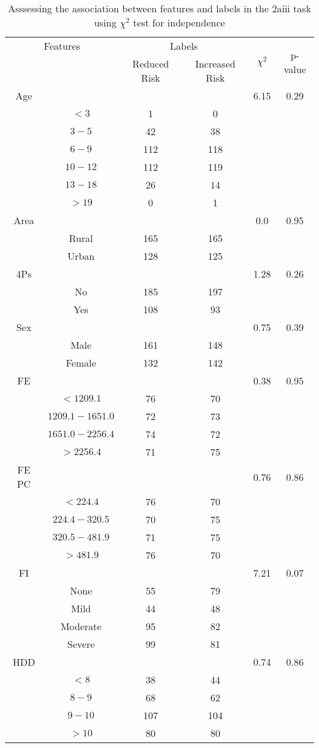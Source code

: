 \begin{table}[!htb]
\centering
\caption{Asssessing the association between features and labels in the 2aiii task using $\chi^2$ test for independence}
\label{tab:chitest_2aiii}
\begin{tabular}{c c | c c| c | c}
\hline
\multicolumn{2}{c|}{Features}& \multicolumn{2}{c|}{Labels}& \multirow{2}{*}{$\chi^2$} & \multirow{2}{*}{p-value}\\ 
& & Reduced Risk & Increased Risk & & \\ 
\hline
Age &  &  & & 6.15 & 0.29 \\ 
& $< 3$ & 1 & 0& & \\ 
& $3-5$ & 42 & 38& & \\ 
& $6-9$ & 112 & 118& & \\ 
& $10-12$ & 112 & 119& & \\ 
& $13-18$ & 26 & 14& & \\ 
& $> 19$ & 0 & 1& & \\ 
\hline 
Area &  &  & & 0.0 & 0.95 \\ 
& Rural & 165 & 165& & \\ 
& Urban & 128 & 125& & \\ 
\hline 
4Ps &  &  & & 1.28 & 0.26 \\ 
& No & 185 & 197& & \\ 
& Yes & 108 & 93& & \\ 
\hline 
Sex &  &  & & 0.75 & 0.39 \\ 
& Male & 161 & 148& & \\ 
& Female & 132 & 142& & \\ 
\hline 
FE &  &  & & 0.38 & 0.95 \\ 
& $< 1209.1$ & 76 & 70& & \\ 
& $1209.1-1651.0$ & 72 & 73& & \\ 
& $1651.0-2256.4$ & 74 & 72& & \\ 
& $> 2256.4$ & 71 & 75& & \\ 
\hline 
FE PC &  &  & & 0.76 & 0.86 \\ 
& $< 224.4$ & 76 & 70& & \\ 
& $224.4-320.5$ & 70 & 75& & \\ 
& $320.5-481.9$ & 71 & 75& & \\ 
& $> 481.9$ & 76 & 70& & \\ 
\hline 
FI &  &  & & 7.21 & 0.07 \\ 
& None & 55 & 79& & \\ 
& Mild & 44 & 48& & \\ 
& Moderate & 95 & 82& & \\ 
& Severe & 99 & 81& & \\ 
\hline 
HDD &  &  & & 0.74 & 0.86 \\ 
& $< 8$ & 38 & 44& & \\ 
& $8-9$ & 68 & 62& & \\ 
& $9-10$ & 107 & 104& & \\ 
& $> 10$ & 80 & 80& & \\ 
\hline 
\end{tabular}
\end{table}
